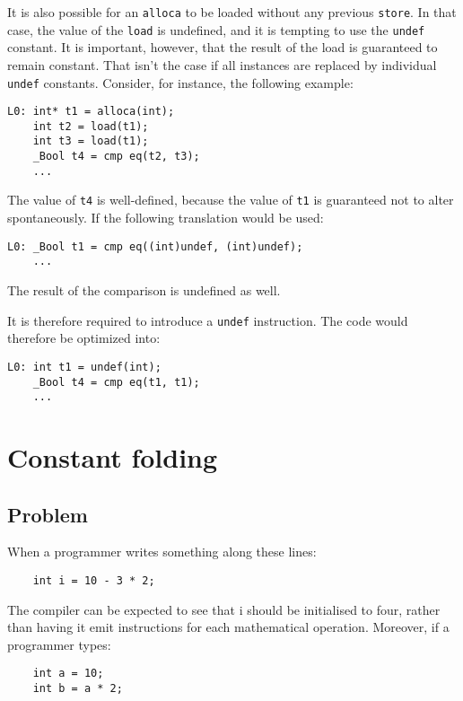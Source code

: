 \documentclass[12pt, a4paper]{article}
\begin{document}
It is also possible for an \verb+alloca+ to be loaded without any previous 
\verb+store+. In that case, the value of the \verb+load+ is undefined, and it is 
tempting to use the \verb+undef+ constant. It is important, however, that the 
result of the load is guaranteed to remain constant. That isn't the case if all 
instances are replaced by individual \verb+undef+ constants. Consider, for 
instance, the following example:

\begin{lstlisting}
L0:	int* t1 = alloca(int);
	int t2 = load(t1);
	int t3 = load(t1);
	_Bool t4 = cmp eq(t2, t3);
	...
\end{lstlisting}

The value of \verb+t4+ is well-defined, because the value of \verb+t1+ is
guaranteed not to alter spontaneously. If the following translation would be 
used:

\begin{lstlisting}
L0:	_Bool t1 = cmp eq((int)undef, (int)undef);
	...
\end{lstlisting}

The result of the comparison is undefined as well.

It is therefore required to introduce a \verb+undef+ instruction. The code would 
therefore be
optimized into:

\begin{lstlisting}
L0:	int t1 = undef(int);
	_Bool t4 = cmp eq(t1, t1);
	...
\end{lstlisting}


\section{Constant folding}
\subsection{Problem}
When a programmer writes something along these lines:

\begin{lstlisting}
	int i = 10 - 3 * 2;
\end{lstlisting}

The compiler can be expected to see that i should be initialised to four, rather 
than having it emit instructions for each mathematical operation. Moreover, if a 
programmer types:

\begin{lstlisting}
	int a = 10;
	int b = a * 2;
\end{lstlisting}
\end{document}
